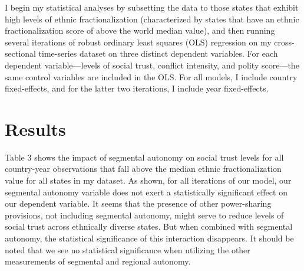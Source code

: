 \documentclass[12pt]{article}
\begin{document}
I begin my statistical analyses by subsetting the data to those states that exhibit high levels of ethnic fractionalization (characterized by states that have an ethnic fractionalization score of above the world median value), and then running several iterations of robust ordinary least squares (OLS) regression on my cross-sectional time-series dataset on three distinct dependent variables. For each dependent variable—levels of social trust, conflict intensity, and polity score—the same control variables are included in the OLS. For all models, I include country fixed-effects, and for the latter two iterations, I include year fixed-effects. 

\section{Results}
Table 3 shows the impact of segmental autonomy on social trust levels for all country-year observations that fall above the median ethnic fractionalization value for all states in my dataset. As shown, for all iterations of our model, our segmental autonomy variable does not exert a statistically significant effect on our dependent variable. It seems that the presence of other power-sharing provisions, not including segmental autonomy, might serve to reduce levels of social trust across ethnically diverse states. But when combined with segmental autonomy, the statistical significance of this interaction disappears. It should be noted that we see no statistical significance when utilizing the other measurements of segmental and regional autonomy. 
\end{document}
